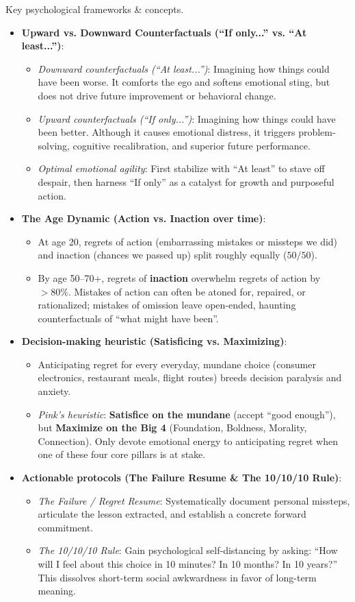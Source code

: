 \documentclass{article}
\begin{document}
\begin{enumerate}
	{\sf Key psychological frameworks \& concepts.}
	\begin{itemize}
		\item {\bf Upward vs. Downward Counterfactuals (``If only...'' vs. ``At least...'')}:
		\begin{itemize}
			\item {\it Downward counterfactuals (``At least...'')}: Imagining how things could have been worse. It comforts the ego and softens emotional sting, but does not drive future improvement or behavioral change.
			\item {\it Upward counterfactuals (``If only...'')}: Imagining how things could have been better. Although it causes emotional distress, it triggers problem-solving, cognitive recalibration, and superior future performance.
			\item {\it Optimal emotional agility}: First stabilize with ``At least'' to stave off despair, then harness ``If only'' as a catalyst for growth and purposeful action.
		\end{itemize}
		\item {\bf The Age Dynamic (Action vs. Inaction over time)}:
		\begin{itemize}
			\item At age 20, regrets of action (embarrassing mistakes or missteps we did) and inaction (chances we passed up) split roughly equally ($50/50$).
			\item By age 50--70+, regrets of {\bf inaction} overwhelm regrets of action by $> 80\%$. Mistakes of action can often be atoned for, repaired, or rationalized; mistakes of omission leave open-ended, haunting counterfactuals of ``what might have been''.
		\end{itemize}
		\item {\bf Decision-making heuristic (Satisficing vs. Maximizing)}:
		\begin{itemize}
			\item Anticipating regret for every everyday, mundane choice (consumer electronics, restaurant meals, flight routes) breeds decision paralysis and anxiety.
			\item {\it Pink's heuristic}: {\bf Satisfice on the mundane} (accept ``good enough''), but {\bf Maximize on the Big 4} (Foundation, Boldness, Morality, Connection). Only devote emotional energy to anticipating regret when one of these four core pillars is at stake.
		\end{itemize}
		\item {\bf Actionable protocols (The Failure Resume \& The 10/10/10 Rule)}:
		\begin{itemize}
			\item {\it The Failure / Regret Resume}: Systematically document personal missteps, articulate the lesson extracted, and establish a concrete forward commitment.
			\item {\it The 10/10/10 Rule}: Gain psychological self-distancing by asking: ``How will I feel about this choice in 10 minutes? In 10 months? In 10 years?'' This dissolves short-term social awkwardness in favor of long-term meaning.
		\end{itemize}
	\end{itemize}


\end{enumerate}
\end{document}
